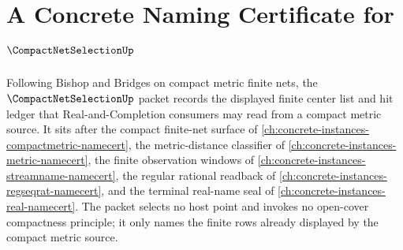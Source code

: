 \chapter{A Concrete Naming Certificate for $\CompactNetSelectionUp$}
\label{ch:concrete-instances-compact-net-selection-namecert}

Following Bishop and Bridges on compact metric finite nets, the $\CompactNetSelectionUp$ packet records the displayed finite center list and hit ledger that Real-and-Completion consumers may read from a compact metric source. It sits after the compact finite-net surface of \autoref{ch:concrete-instances-compactmetric-namecert}, the metric-distance classifier of \autoref{ch:concrete-instances-metric-namecert}, the finite observation windows of \autoref{ch:concrete-instances-streamname-namecert}, the regular rational readback of \autoref{ch:concrete-instances-regseqrat-namecert}, and the terminal real-name seal of \autoref{ch:concrete-instances-real-namecert}. The packet selects no host point and invokes no open-cover compactness principle; it only names the finite rows already displayed by the compact metric source.

